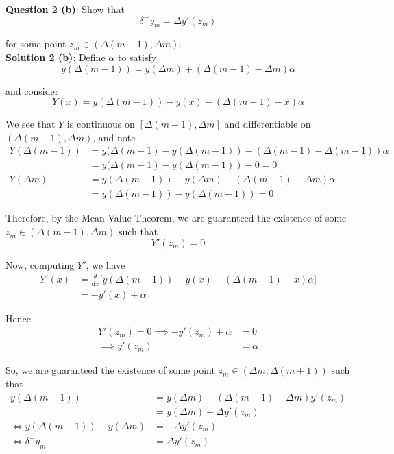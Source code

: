 \documentclass[12pt]{article}
\newlength\tindent
\renewcommand{\indent}{\hspace*{\tindent}}
\begin{document}

{\bf Question 2 (b)}: Show that
\begin{equation*}
	\delta^-y_m = \Delta y'(z_m)
\end{equation*}

for some point $z_m \in \left(\Delta (m - 1), \Delta m \right)$. \\

{\bf Solution 2 (b)}: Define $\alpha$ to satisfy 
\begin{equation*}
	y(\Delta(m - 1)) = y(\Delta m) + (\Delta(m - 1) - \Delta m)\alpha
\end{equation*}

and consider
\begin{equation*}
	Y(x) = y(\Delta(m - 1)) - y(x) - (\Delta(m - 1) - x)\alpha
\end{equation*}

We see that $Y$ is continuous on $[\Delta (m - 1), \Delta m]$ and differentiable on $(\Delta (m - 1), \Delta m)$, and note
\begin{align*}
	Y(\Delta (m - 1)) &= y(\Delta(m - 1) - y(\Delta(m - 1)) - (\Delta(m - 1) - \Delta(m - 1))\alpha \\
	&= y(\Delta(m - 1) - y(\Delta (m - 1)) - 0 = 0 \\
	Y(\Delta m) &= y(\Delta(m - 1)) - y(\Delta m) - (\Delta(m - 1) - \Delta m)\alpha \\
	&= y(\Delta(m - 1)) - y(\Delta(m - 1)) = 0
\end{align*}

\indent Therefore, by the Mean Value Theorem, we are guaranteed the existence of some $z_m \in (\Delta (m - 1), \Delta m)$ such that
\begin{equation*}
	Y'(z_m) = 0 
\end{equation*}

Now, computing $Y'$, we have
\begin{align*}
	Y'(x) &= \frac{d}{dx} \Big[ y(\Delta(m - 1)) - y(x) - (\Delta(m - 1) - x)\alpha \Big] \\
	&= -y'(x) + \alpha
\end{align*}

Hence
\begin{align*}
	Y'(z_m) = 0 \implies -y'(z_m) + \alpha &= 0 \\
	\implies y'(z_m) &= \alpha
\end{align*}

So, we are guaranteed the existence of some point $z_m \in (\Delta m, \Delta(m + 1))$ such that
\begin{align*}
	y(\Delta(m - 1)) &= y(\Delta m) + (\Delta(m - 1) - \Delta m)y'(z_m) \\
	&= y(\Delta m) - \Delta y'(z_m) \\
	\iff	 y(\Delta(m - 1)) - y(\Delta m) &= - \Delta y'(z_m) \\
	\iff \delta^+y_m &= \Delta y'(z_m)
\end{align*}
\end{document}
